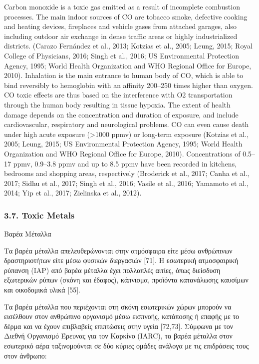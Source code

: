 Carbon monoxide is a toxic gas emitted as a result of incomplete combustion processes. The main indoor sources of CO are tobacco smoke, defective cooking and heating devices, fireplaces and vehicle gases from attached garages, also including outdoor air exchange in dense traffic areas or highly industrialized districts. (Carazo Fernández et al., 2013; Kotzias et al., 2005; Leung, 2015; Royal College of Physicians, 2016; Singh et al., 2016; US Environmental Protection Agency, 1995; World Health Organization and WHO Regional Office for Europe, 2010). Inhalation is the main entrance to human body of CO, which is able to bind reversibly to hemoglobin with an affinity 200–250 times higher than oxygen. CO toxic effects are thus based on the interference with O2 transportation through the human body resulting in tissue hypoxia. The extent of health damage depends on the concentration and duration of exposure, and include cardiovascular, respiratory and neurological problems. CO can even cause death under high acute exposure (>1000 ppmv) or long-term exposure (Kotzias et al., 2005; Leung, 2015; US Environmental Protection Agency, 1995; World Health Organization and WHO Regional Office for Europe, 2010). Concentrations of 0.5–17 ppmv, 0.9–3.8 ppmv and up to 8.5 ppmv have been recorded in kitchens, bedrooms and shopping areas, respectively (Broderick et al., 2017; Canha et al., 2017; Sidhu et al., 2017; Singh et al., 2016; Vasile et al., 2016; Yamamoto et al., 2014; Yip et al., 2017; Zielinska et al., 2012).


\cite{GONZALEZMARTIN2021128376}

 \subsubsection{3.7. Toxic Metals}

 Βαρέα Μέταλλα

Τα βαρέα μέταλλα απελευθερώνονται στην ατμόσφαιρα είτε μέσω ανθρώπινων δραστηριοτήτων είτε μέσω φυσικών διεργασιών [71]. Η εσωτερική ατμοσφαιρική ρύπανση (IAP) από βαρέα μέταλλα έχει πολλαπλές αιτίες, όπως διείσδυση εξωτερικών ρύπων (σκόνη και έδαφος), κάπνισμα, προϊόντα κατανάλωσης καυσίμων και οικοδομικά υλικά [55].

Τα βαρέα μέταλλα που περιέχονται στη σκόνη εσωτερικών χώρων μπορούν να εισέλθουν στον ανθρώπινο οργανισμό μέσω εισπνοής, κατάποσης ή επαφής με το δέρμα και να έχουν επιβλαβείς επιπτώσεις στην υγεία [72,73]. Σύμφωνα με τον Διεθνή Οργανισμό Έρευνας για τον Καρκίνο (IARC), τα βαρέα μέταλλα στον εσωτερικό αέρα ταξινομούνται σε δύο κύριες ομάδες ανάλογα με τις επιδράσεις τους στον άνθρωπο:

